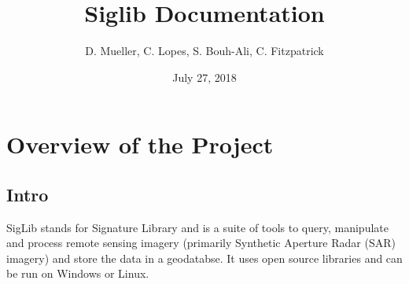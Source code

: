 \documentclass[letterpaper,10pt,openany,oneside]{sphinxmanual}
\title{Siglib Documentation}
\date{July 27, 2018}
\author{D. Mueller, C. Lopes, S. Bouh-Ali, C. Fitzpatrick}
\begin{document}
\maketitle
\tableofcontents
{}\label{index::doc}



\chapter{Overview of the Project}
\label{intro:overview-of-the-project}\label{intro:welcome-to-siglib-s-documentation}\label{intro::doc}

\section{Intro}
\label{intro:intro}
SigLib stands for Signature Library and is a suite of tools to query,
manipulate and process remote sensing imagery (primarily Synthetic
Aperture Radar (SAR) imagery) and store the data in a geodatabse. It
uses open source libraries and can be run on Windows or Linux.
\end{document}

